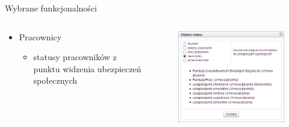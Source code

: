 \documentclass[10pt,utf8]{beamer}
\begin{document}
\begin{frame}{Wybrane funkcjonalności}	
	\begin{columns}
		\begin{column}{5cm}
			\begin{itemize}
				\item Pracownicy
				\begin{itemize}
					\item statusy pracowników z punktu widzenia ubezpieczeń społecznych
				\end{itemize}
			\end{itemize}
		\end{column}
		\begin{column}{5cm}
			\begin{figure}[h]
    		\begin{center}
    			\includegraphics[angle=0,scale=0.5]{status.png}
    		\end{center}
			\end{figure}
\end{column}
\end{columns}
\end{frame}
\end{document}
